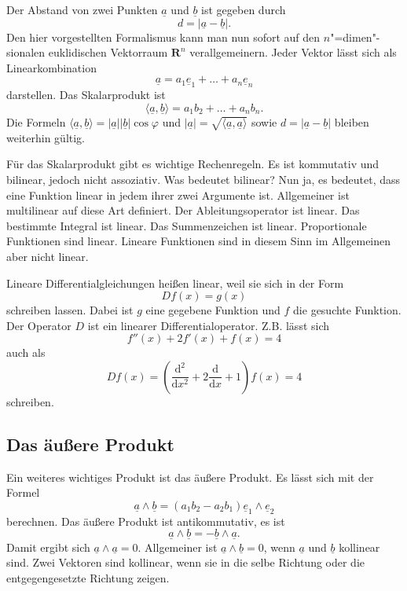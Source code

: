 \documentclass[a4paper,10pt,fleqn,twocolumn,twoside]{article}
\begin{document}
Der Abstand von zwei Punkten \(\underline a\) und \(\underline b\)
ist gegeben durch
\[d = |\underline a-\underline b|.\]
\noindent
Den hier vorgestellten Formalismus kann man nun sofort auf den
\(n\)"=dimen"-sionalen euklidischen Vektorraum \(\mathbf{R}^n\)
verallgemeinern. Jeder Vektor lässt sich als Linearkombination
\[\underline a = a_1\underline e_1+\dots+a_n\underline e_n\]
darstellen. Das Skalarprodukt ist
\[\langle \underline a, \underline b\rangle = a_1b_2+\dots+a_nb_n.\]
Die Formeln
\(\langle \underline a, \underline b\rangle
= |\underline a||\underline b|\cos\varphi\)
und
\(|\underline a| = \sqrt{\langle \underline a, \underline a\rangle}\)
sowie \(d = |\underline a-\underline b|\)
bleiben weiterhin gültig.

Für das Skalarprodukt gibt es wichtige Rechenregeln. Es ist kommutativ
und bilinear, jedoch nicht assoziativ.
Was bedeutet bilinear? Nun ja, es bedeutet, dass eine Funktion linear
in jedem ihrer zwei Argumente ist. Allgemeiner ist multilinear auf
diese Art definiert. Der Ableitungsoperator ist linear. Das bestimmte
Integral ist linear. Das Summenzeichen ist linear. Proportionale
Funktionen sind linear. Lineare Funktionen sind in diesem Sinn im
Allgemeinen aber nicht linear.

Lineare Differentialgleichungen heißen linear,
weil sie sich in der Form
\[Df(x)=g(x)\]
schreiben lassen. Dabei ist \(g\) eine gegebene Funktion und \(f\)
die gesuchte Funktion. Der Operator \(D\) ist ein linearer
Differentialoperator. Z.B. lässt sich
\[f''(x) + 2f'(x) + f(x) = 4\]
auch als
\[Df(x) = \left(\frac{\mathrm d^2}{\mathrm dx^2}
+2\frac{\mathrm d}{\mathrm dx}
+1\right) f(x) = 4\]
schreiben.

\subsection{Das äußere Produkt}

Ein weiteres wichtiges Produkt ist das äußere Produkt.
Es lässt sich mit der Formel
\[\underline a\wedge\underline b
= (a_1b_2-a_2b_1)\underline e_1\wedge\underline e_2\]
berechnen. Das äußere Produkt ist antikommutativ, es ist
\[\underline a\wedge\underline b = -\underline b\wedge\underline a.\]
\noindent
Damit ergibt sich \(\underline a\wedge\underline a = 0\).
Allgemeiner ist
\(\underline a\wedge\underline b = 0\),
wenn \(\underline a\) und \(\underline b\) kollinear sind.
Zwei Vektoren sind kollinear, wenn sie in die selbe Richtung oder
die entgegengesetzte Richtung zeigen.
\end{document}
